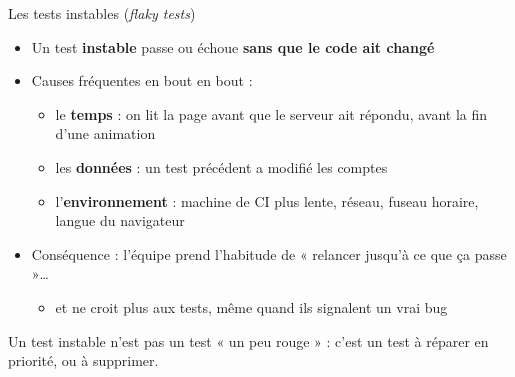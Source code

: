 \documentclass[aspectratio=169,10pt]{beamer}
\begin{document}
\begin{frame}{Les tests instables (\textit{flaky tests})}
  \begin{itemize}
    \item Un test \textbf{instable} passe ou échoue \textbf{sans que le code ait changé}
    \item Causes fréquentes en bout en bout :
      \begin{itemize}
        \item le \textbf{temps} : on lit la page avant que le serveur ait répondu, avant la fin d'une animation
        \item les \textbf{données} : un test précédent a modifié les comptes
        \item l'\textbf{environnement} : machine de CI plus lente, réseau, fuseau horaire, langue du navigateur
      \end{itemize}
    \item Conséquence : l'équipe prend l'habitude de « relancer jusqu'à ce que ça passe »\ldots
      \begin{itemize}
        \item et ne croit plus aux tests, même quand ils signalent un vrai bug
      \end{itemize}
  \end{itemize}
  \vspace{2mm}
  \begin{datacard}
    \small Un test instable n'est pas un test « un peu rouge » : c'est un test \alert{à réparer en priorité}, ou à supprimer.
  \end{datacard}
\end{frame}
\end{document}
